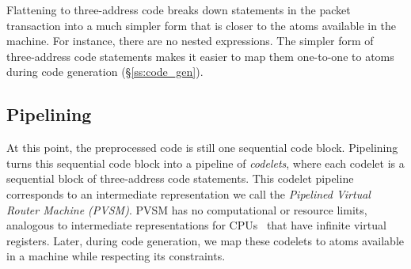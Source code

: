 Flattening to three-address code breaks down statements in the packet
transaction into a much simpler form that is closer to the atoms available in
the \absmachine machine. For instance, there are no nested expressions. The
simpler form of three-address code statements makes it easier to map them
one-to-one to atoms during code generation (\S\ref{ss:code_gen}).

\subsection{Pipelining}
\label{ss:pipelining}
At this point, the preprocessed code is still one sequential code block.
Pipelining turns this sequential code block into a pipeline of
\textit{codelets}, where each codelet is a sequential block of three-address
code statements. This codelet pipeline corresponds to an intermediate
representation we call the \textit{Pipelined Virtual Router Machine (PVSM)}.
PVSM has no computational or resource limits, analogous to intermediate
representations for CPUs~\cite{llvm} that have infinite virtual registers.
Later, during code generation, we map these codelets to atoms available in a
\absmachine machine while respecting its constraints.

